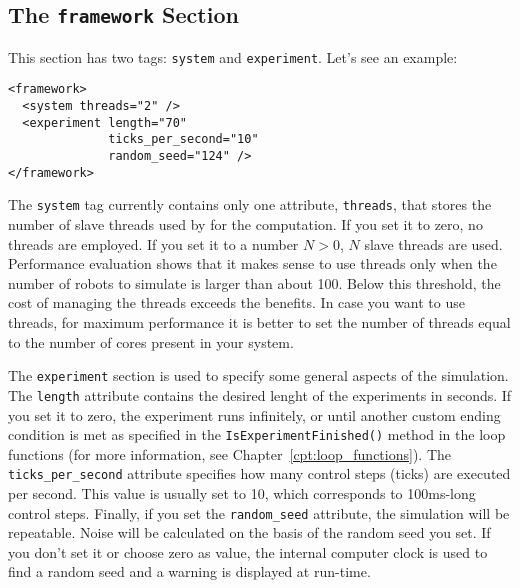 \subsection{The \texttt{framework} Section}
This section has two tags: \texttt{system} and
\texttt{experiment}. Let's see an example:
\begin{lstlisting}
<framework>
  <system threads="2" />
  <experiment length="70"
              ticks_per_second="10"
              random_seed="124" />
</framework>
\end{lstlisting}
The \texttt{system} tag currently contains only one attribute,
\texttt{threads}, that stores the number of slave threads used by
\argos for the computation. If you set it to zero, no threads are
employed. If you set it to a number $N > 0$, $N$ slave threads are
used. Performance evaluation shows that it makes sense to use threads
only when the number of robots to simulate is larger than about
100. Below this threshold, the cost of managing the threads exceeds
the benefits. In case you want to use threads, for maximum performance
it is better to set the number of threads equal to the number of cores
present in your system.

The \texttt{experiment} section is used to specify some general
aspects of the simulation. The \texttt{length} attribute contains the
desired lenght of the experiments in seconds. If you set it to zero,
the experiment runs infinitely, or until another custom ending
condition is met as specified in the \texttt{IsExperimentFinished()}
method in the loop functions (for more information, see
Chapter~\ref{cpt:loop_functions}). The \texttt{ticks\_per\_second}
attribute specifies how many control steps (ticks) are executed per
second. This value is usually set to 10, which corresponds to
100ms-long control steps. Finally, if you set the
\texttt{random\_seed} attribute, the simulation will be
repeatable. Noise will be calculated on the basis of the random seed
you set. If you don't set it or choose zero as value, the internal
computer clock is used to find a random seed and a warning is
displayed at run-time.

